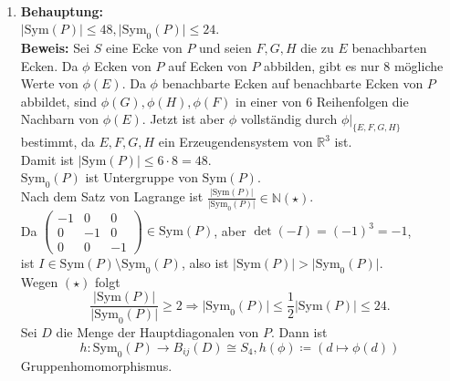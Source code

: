 \begin{solution}
\
 \begin{enumerate}[label=(\alph*)] 
    \item \textbf{Behauptung:} \\
  \( \vert \text{Sym}(P) \vert \leq 48, \vert \text{Sym}_0(P) \vert \leq 24 \). \\
  \textbf{Beweis:} Sei \( S \) eine Ecke von \( P \) und seien \( F,G,H \) die zu \( E \) benachbarten Ecken. Da \( \phi \) Ecken von \( P \) auf Ecken von \( P \) abbilden, gibt es nur 8 mögliche Werte von \( \phi(E) \). Da \( \phi \) benachbarte Ecken auf benachbarte Ecken von \( P \) abbildet, sind \( \phi(G), \phi(H), \phi(F) \) in einer von 6 Reihenfolgen die Nachbarn von \( \phi(E) \). Jetzt ist aber \( \phi \) vollständig durch \( \phi|_{\{ E,F,G,H \}} \) bestimmt, da \( E,F,G,H \) ein Erzeugendensystem von \( \mathbb{R}^3 \) ist. \\
  Damit ist \( \vert \text{Sym}(P) \vert \leq 6 \cdot 8 = 48 \). \\
  \( \text{Sym}_0(P) \) ist Untergruppe von \( \text{Sym}(P) \). \\
  Nach dem Satz von Lagrange ist \( \frac{\vert \text{Sym}(P) \vert}{\vert \text{Sym}_0(P) \vert} \in \mathbb{N} (\star) \). \\
  Da \( \begin{pmatrix}
    -1 & 0 & 0 \\
    0 & -1 & 0 \\
    0 & 0 & -1 
  \end{pmatrix} \in \text{Sym}(P) \), aber \( \det(-I) = {(-1)}^3 = -1 \),\\
  ist \( I \in \text{Sym}(P) \setminus \text{Sym}_0(P) \), also ist \( \vert \text{Sym}(P) \vert > \vert \text{Sym}_0(P) \vert \). \\
  Wegen \( (\star) \) folgt
  \begin{equation*}
    \frac{\vert \text{Sym}(P) \vert}{\vert \text{Sym}_0(P) \vert} \geq 2 \Rightarrow \vert \text{Sym}_0(P) \vert \leq \frac{1}{2} \vert \text{Sym}(P) \vert \leq 24.
  \end{equation*}
  Sei \( D \) die Menge der Hauptdiagonalen von \( P \). Dann ist 
  \begin{equation*}
    h: \text{Sym}_0(P) \to B_{ij}(D) \cong S_4, h(\phi) \coloneqq (d \mapsto \phi(d))
  \end{equation*}
  Gruppenhomomorphismus. \\
  

\end{enumerate}
\end{solution}
